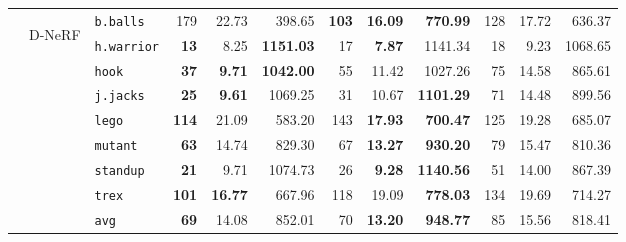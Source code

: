 \begin{table}[tbp]
{\begin{tabular}{@{\hskip 2pt}cc|@{\hskip 2pt}l@{\hskip 2pt}|@{\hskip 2pt}r@{\hskip 2pt}r@{\hskip 2pt}r|@{\hskip 2pt}r@{\hskip 2pt}r@{\hskip 2pt}r|@{\hskip 2pt}r@{\hskip 2pt}r@{\hskip 2pt}r@{\hskip 2pt}}
& \multirow{9}{*}{\begin{sideways}D-NeRF\end{sideways}}
        & \texttt{b.balls}  & 179 & 22.73 & 398.65 & \bf 103 & \bf 16.09 & \bf 770.99 & 128 & 17.72 & 636.37 \\
        & & \texttt{h.warrior}& \bf 13 & 8.25 & \bf 1151.03 & 17 & \bf 7.87 & 1141.34 & 18 & 9.23 & 1068.65 \\
        & & \texttt{hook}     & \bf 37 & \bf 9.71 & \bf 1042.00 & 55 & 11.42 & 1027.26 & 75 & 14.58 & 865.61 \\
        & & \texttt{j.jacks}  & \bf 25 & \bf 9.61 & 1069.25 & 31 & 10.67 & \bf 1101.29 & 71 & 14.48 & 899.56 \\
        & & \texttt{lego}     & \bf 114 & 21.09 & 583.20 & 143 & \bf 17.93 & \bf 700.47 & 125 & 19.28 & 685.07 \\
        & & \texttt{mutant}   & \bf 63 & 14.74 & 829.30 & 67 & \bf 13.27 & \bf 930.20 & 79 & 15.47 & 810.36 \\
        & & \texttt{standup}  & \bf 21 & 9.71 & 1074.73 & 26 & \bf 9.28 & \bf 1140.56 & 51 & 14.00 & 867.39 \\
        & & \texttt{trex}     & \bf 101 & \bf 16.77 & 667.96 & 118 & 19.09 & \bf 778.03 & 134 & 19.69 & 714.27 \\
    \cmidrule{3-12}
        & & \texttt{avg}
          & \bf 69
          & 14.08
          & 852.01
          & 70
          & \bf 13.20
          & \bf 948.77
          & 85
          & 15.56
          & 818.41 \\
    \bottomrule
    \end{tabular}
    }
  \label{tab:efficiency_combined}
\end{table}
